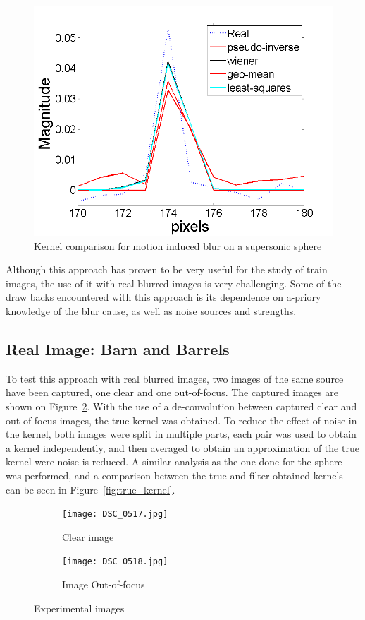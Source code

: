 \begin{figure}[H]
  \centering
                \centering
                \includegraphics[width=.4\textwidth]{kernel_motion.png}
                \caption{Kernel comparison for motion induced blur on a supersonic sphere}
 \label{fig:sph_kernels}
\end{figure}

Although this approach has proven to be very useful for the study of train images, the use of it with real blurred images is very challenging. Some of the draw backs encountered with this approach is its dependence on a-priory knowledge of the blur cause, as well as noise sources and strengths. 
\subsection{Real Image: Barn and Barrels}
To test this approach with real blurred images, two images of the same source have been captured, one clear and one out-of-focus. The captured images are shown on Figure~\ref{fig:barrels}. With the use of a de-convolution between captured clear and out-of-focus images, the true kernel was obtained. To reduce the effect of noise in the kernel, both images were split in multiple parts, each pair was used to obtain a kernel independently, and then averaged to obtain an approximation of the true kernel were noise is reduced. A similar analysis as the one done for the sphere was performed, and a comparison between the true and filter obtained kernels can be seen in Figure~\ref{fig:true_kernel}.

\begin{figure}[H]
        \centering
        \begin{subfigure}[b]{0.3\textwidth}
                \centering
                \texttt{[image: DSC\_0517.jpg]}
                \caption{Clear image}
                
        \end{subfigure}
        \hspace{1.5cm}
        \begin{subfigure}[b]{0.3\textwidth}
                \centering
                \texttt{[image: DSC\_0518.jpg]}
                \caption{Image Out-of-focus} 
        \end{subfigure}
\caption{Experimental images}
\label{fig:barrels}
\end{figure}


